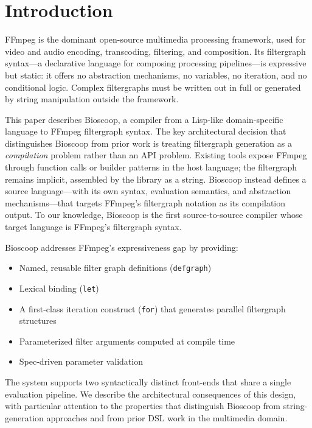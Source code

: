 \documentclass[english,submission]{programming}
\begin{document}
\section{Introduction}

FFmpeg is the dominant open-source multimedia processing framework, used for video and audio encoding, transcoding, filtering, and composition. Its filtergraph syntax---a declarative language for composing processing pipelines---is expressive but static: it offers no abstraction mechanisms, no variables, no iteration, and no conditional logic. Complex filtergraphs must be written out in full or generated by string manipulation outside the framework.

This paper describes Bioscoop, a compiler from a Lisp-like domain-specific language to FFmpeg filtergraph syntax. The key architectural decision that distinguishes Bioscoop from prior work is treating filtergraph generation as a \emph{compilation} problem rather than an API problem. Existing tools expose FFmpeg through function calls or builder patterns in the host language; the filtergraph remains implicit, assembled by the library as a string. Bioscoop instead defines a source language---with its own syntax, evaluation semantics, and abstraction mechanisms---that targets FFmpeg's filtergraph notation as its compilation output. To our knowledge, Bioscoop is the first source-to-source compiler whose target language is FFmpeg's filtergraph syntax.

Bioscoop addresses FFmpeg's expressiveness gap by providing:

\begin{itemize}
\item Named, reusable filter graph definitions (\texttt{defgraph})
\item Lexical binding (\texttt{let})
\item A first-class iteration construct (\texttt{for}) that generates parallel filtergraph structures
\item Parameterized filter arguments computed at compile time
\item Spec-driven parameter validation
\end{itemize}

The system supports two syntactically distinct front-ends that share a single evaluation pipeline. We describe the architectural consequences of this design, with particular attention to the properties that distinguish Bioscoop from string-generation approaches and from prior DSL work in the multimedia domain.
\end{document}
